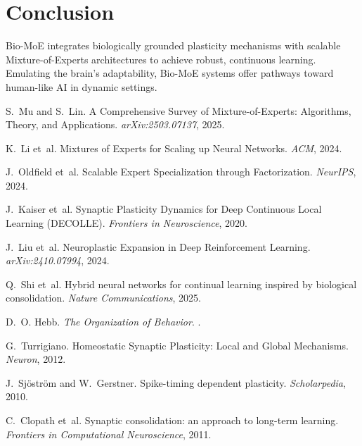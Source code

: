 \documentclass[12pt]{article}
\begin{document}
\section{Conclusion}
Bio-MoE integrates biologically grounded plasticity mechanisms with scalable Mixture-of-Experts architectures to achieve robust, continuous learning. Emulating the brain's adaptability, Bio-MoE systems offer pathways toward human-like AI in dynamic settings.


\begin{thebibliography}{20}

S.~Mu and S.~Lin.
\newblock A Comprehensive Survey of Mixture-of-Experts: Algorithms, Theory, and Applications.
\newblock \emph{arXiv:2503.07137}, 2025.

K.~Li et~al.
\newblock Mixtures of Experts for Scaling up Neural Networks.
\newblock \emph{ACM}, 2024.

J.~Oldfield et~al.
\newblock Scalable Expert Specialization through Factorization.
\newblock \emph{NeurIPS}, 2024.

J.~Kaiser et~al.
\newblock Synaptic Plasticity Dynamics for Deep Continuous Local Learning (DECOLLE).
\newblock \emph{Frontiers in Neuroscience}, 2020.

J.~Liu et~al.
\newblock Neuroplastic Expansion in Deep Reinforcement Learning.
\newblock \emph{arXiv:2410.07994}, 2024.

Q.~Shi et~al.
\newblock Hybrid neural networks for continual learning inspired by biological consolidation.
\newblock \emph{Nature Communications}, 2025.

D.~O. Hebb.
\newblock \emph{The Organization of Behavior}.
.

G.~Turrigiano.
\newblock Homeostatic Synaptic Plasticity: Local and Global Mechanisms.
\newblock \emph{Neuron}, 2012.

J.~Sj{\"o}str{\"o}m and W.~Gerstner.
\newblock Spike-timing dependent plasticity.
\newblock \emph{Scholarpedia}, 2010.

C.~Clopath et~al.
\newblock Synaptic consolidation: an approach to long-term learning.
\newblock \emph{Frontiers in Computational Neuroscience}, 2011.


\end{thebibliography}
\end{document}
